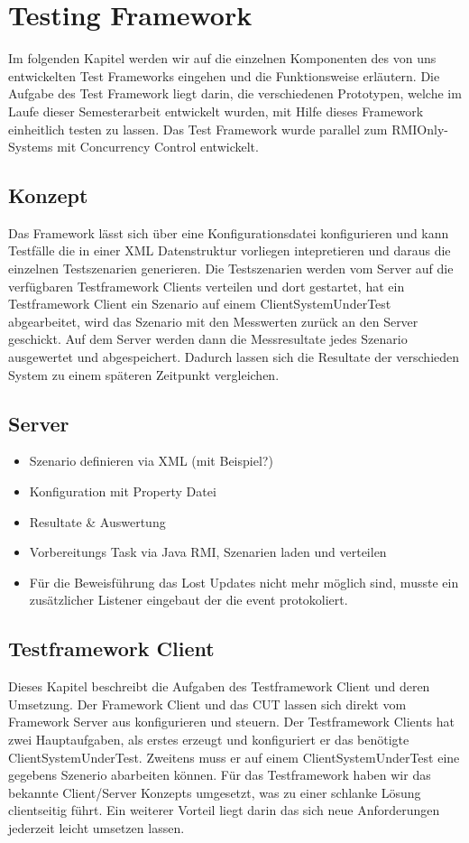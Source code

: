 \section{Testing Framework}
\label{sec:testing Framework}
Im folgenden Kapitel werden wir auf die einzelnen Komponenten des von uns entwickelten Test Frameworks eingehen und die Funktionsweise erläutern. Die Aufgabe des Test Framework liegt darin, die verschiedenen Prototypen, welche im Laufe dieser Semesterarbeit entwickelt wurden, mit Hilfe dieses Framework einheitlich testen zu lassen. Das Test Framework wurde parallel zum RMIOnly- Systems mit Concurrency Control entwickelt.

\subsection{Konzept}
Das Framework lässt sich über eine Konfigurationsdatei konfigurieren und kann Testfälle die in einer XML Datenstruktur vorliegen intepretieren und daraus die einzelnen Testszenarien generieren. Die Testszenarien werden vom Server auf die verfügbaren Testframework Clients verteilen und dort gestartet, hat ein Testframework Client ein Szenario auf einem ClientSystemUnderTest abgearbeitet, wird das Szenario mit den Messwerten zurück an den Server geschickt. Auf dem Server werden dann die Messresultate jedes Szenario ausgewertet und abgespeichert. Dadurch lassen sich die Resultate der verschieden System zu einem späteren Zeitpunkt vergleichen.


\subsection{Server}
\label{sec:test-FW Server}
\begin{itemize}
\item Szenario definieren via XML (mit Beispiel?)
\item Konfiguration mit Property Datei
\item Resultate \& Auswertung
\item Vorbereitungs Task via Java RMI, Szenarien laden und verteilen
\item Für die Beweisführung das Lost Updates nicht mehr möglich sind, musste ein zusätzlicher Listener eingebaut der die event protokoliert.
\end{itemize}

\subsection{Testframework Client}
\label{sec:test-FW Client}
Dieses Kapitel beschreibt die Aufgaben des Testframework Client und deren Umsetzung. Der Framework Client und das CUT lassen sich direkt vom Framework Server aus konfigurieren und steuern. Der Testframework Clients hat zwei Hauptaufgaben, als erstes erzeugt und konfiguriert er das benötigte ClientSystemUnderTest. Zweitens muss er auf einem ClientSystemUnderTest eine gegebens Szenerio abarbeiten können. Für das Testframework haben wir das bekannte Client/Server Konzepts umgesetzt, was zu einer schlanke Lösung clientseitig führt. Ein weiterer Vorteil liegt darin das sich neue Anforderungen jederzeit leicht umsetzen lassen.


